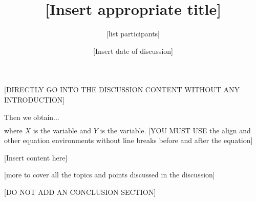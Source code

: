 \documentclass[aps,pra,preprint,11pt,amsmath,amssymb,notitlepage,nofootinbib]{revtex4-2}
\begin{document}
\title{[Insert appropriate title]}
\author{[list participants]}
\date{[Insert date of discussion]}
\maketitle

[DIRECTLY GO INTO THE DISCUSSION CONTENT WITHOUT ANY INTRODUCTION]

Then we obtain...
\begin{align}
\end{align}
where $X$ is the variable and $Y$ is the variable. [YOU MUST USE the align and other equation environments without line breaks before and after the equation]

[Insert content here]

[more to cover all the topics and points discussed in the discussion]

[DO NOT ADD AN CONCLUSION SECTION]



\end{document}
